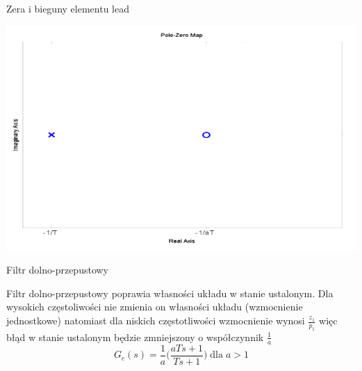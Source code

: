 \documentclass{beamer}
\begin{document}
\begin{frame}{Zera i bieguny elementu lead}
	
	
	\includegraphics[width = \linewidth]{pole_lead}
	
	
\end{frame}	

\begin{frame}{Filtr dolno-przepustowy}

Filtr dolno-przepustowy poprawia własności układu w stanie ustalonym. Dla wysokich częstoliwości nie zmienia on własności układu (wzmocnienie jednostkowe) natomiast dla niskich częstotliwości wzmocnienie wynosi $\frac{z_1}{p_1}$ więc błąd w stanie ustalonym będzie zmniejszony o współczynnik $\frac{1}{a}$
\begin{equation*}
G_{c}(s) = \frac{1}{a} \Big(\frac{aTs + 1}{T s + 1} \Big)  \; \text{dla}\; a>1
\end{equation*}
\end{frame}
\end{document}

